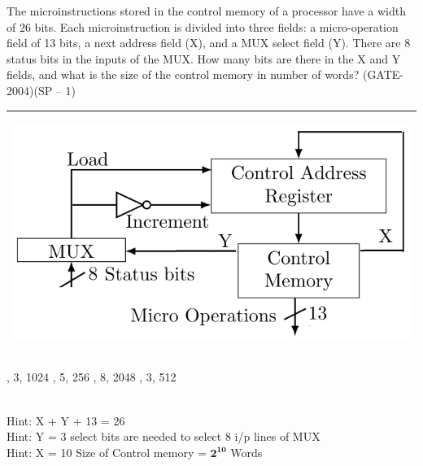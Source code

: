 \begin{questyle}
  \question  The microinstructions stored in the control memory of a processor have a width of 26 bits.
             Each microinstruction is divided into three fields: a micro-operation field of 13 bits, a
             next address field (X), and a MUX select field (Y). There are 8 status bits in the inputs
             of the MUX.  How many bits are there in the X and Y fields, and what is the size of the
             control memory in number of words? (GATE-2004)(SP – 1)

             \begin{myTableStyle} \begin{tabular}{ |m{14cm}| } \hline
                  \begin{center} \includegraphics[scale=0.4]{./images/control_memory.jpeg} \end{center}\\ \hline
            \end{tabular} \end{myTableStyle} \vspace{0.08in}

  \begin{oneparchoices}
    , 3, 1024
    , 5, 256
    , 8, 2048
    , 3, 512
  \end{oneparchoices}
  \\Hint: \quad X + Y + 13 = 26
  \\Hint: \quad Y = 3   select bits are needed to select 8 i/p lines of MUX
  \\Hint: \quad X = 10 \qquad Size of Control memory = \( \mathbf { 2^{10} } \) Words
\end{questyle}


